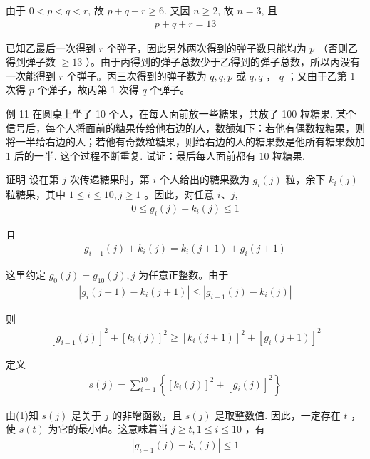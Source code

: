 \documentclass[10pt]{article}
\begin{document}
由于 $0<p<q<r$, 故 $p+q+r \geqslant 6$. 又因 $n \geqslant 2$, 故 $n=3$, 且\\
\begin{align*}
p+q+r=13
\end{align*}

已知乙最后一次得到 $r$ 个弹子，因此另外两次得到的弹子数只能均为 $p$ （否则乙得到弹子数 $\geqslant 13$ ）。由于丙得到的弹子总数少于乙得到的弹子总数，所以丙没有一次能得到 $r$ 个弹子。丙三次得到的弹子数为 $q, q, p$ 或 $q, q$ ， $q$ ；又由于乙第 1 次得 $p$ 个弹子，故丙第 1 次得 $q$ 个弹子。

例 11 在圆桌上坐了 10 个人，在每人面前放一些糖果，共放了 100 粒糖果. 某个信号后，每个人将面前的糖果传给他右边的人，数额如下：若他有偶数粒糖果，则将一半给右边的人；若他有奇数粒糖果，则给右边的人的糖果数是他所有糖果数加 1 后的一半. 这个过程不断重复. 试证：最后每人面前都有 10 粒糖果.

证明 设在第 $j$ 次传递糖果时，第 $i$ 个人给出的糖果数为 $g_{i}(j)$ 粒，余下 $k_{i}(j)$ 粒糖果，其中 $1 \leqslant i \leqslant 10, j \geqslant 1$ 。因此，对任意 $i 、 j$,\\
\begin{align*}
0 \leqslant g_{i}(j)-k_{i}(j) \leqslant 1
\end{align*}

且\\
\begin{align*}
g_{i-1}(j)+k_{i}(j)=k_{i}(j+1)+g_{i}(j+1)
\end{align*}

这里约定 $g_{0}(j)=g_{10}(j), j$ 为任意正整数。由于\\
\begin{align*}
\left|g_{i}(j+1)-k_{i}(j+1)\right| \leqslant\left|g_{i-1}(j)-k_{i}(j)\right|
\end{align*}

则\\
\begin{align*}
\left[g_{i-1}(j)\right]^{2}+\left[k_{i}(j)\right]^{2} \geqslant\left[k_{i}(j+1)\right]^{2}+\left[g_{i}(j+1)\right]^{2}
\end{align*}

定义\\
\begin{align*}
s(j)=\sum_{i=1}^{10}\left\{\left[k_{i}(j)\right]^{2}+\left[g_{i}(j)\right]^{2}\right\}
\end{align*}

由(1)知 $s(j)$ 是关于 $j$ 的非增函数，且 $s(j)$ 是取整数值. 因此，一定存在 $t$ ，使 $s(t)$ 为它的最小值。这意味着当 $j \geqslant t, 1 \leqslant i \leqslant 10$ ，有\\
\begin{align*}
\left|g_{i-1}(j)-k_{i}(j)\right| \leqslant 1
\end{align*}
\end{document}

